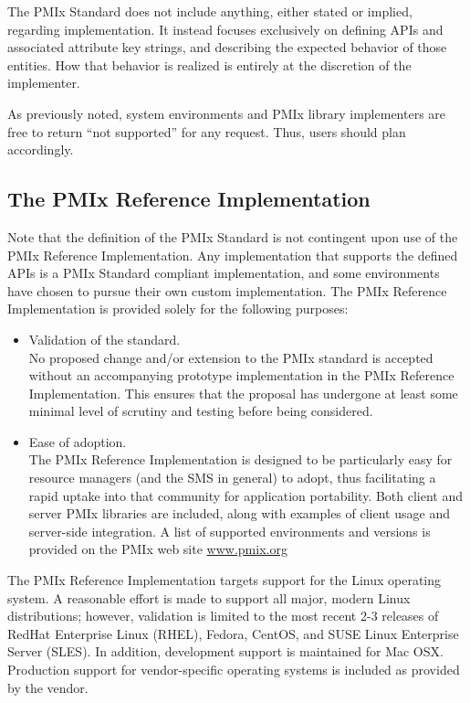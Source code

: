 The \ac{PMIx} Standard does not include anything, either stated or implied, regarding implementation.
It instead focuses exclusively on defining APIs and associated attribute key strings, and describing the expected behavior of those entities.
How that behavior is realized is entirely at the discretion of the implementer.

As previously noted, system environments and \ac{PMIx} library implementers are free to return ``not supported'' for any request. Thus, users should plan accordingly.

\subsection{The PMIx Reference Implementation}

Note that the definition of the \ac{PMIx} Standard is not contingent upon use of the \ac{PMIx} Reference Implementation.
Any implementation that supports the defined APIs is a \ac{PMIx} Standard compliant implementation, and some environments have chosen to pursue their own custom implementation.
The \ac{PMIx} Reference Implementation is provided solely for the following purposes:
\begin{itemize}
\item Validation of the standard.\\
No proposed change and/or extension to the \ac{PMIx} standard is accepted without an accompanying prototype implementation in the \ac{PMIx} Reference Implementation.
This ensures that the proposal has undergone at least some minimal level of scrutiny and testing before being considered.
\item Ease of adoption.\\
The \ac{PMIx} Reference Implementation is designed to be particularly easy for resource managers (and the \ac{SMS} in general) to adopt, thus facilitating a rapid uptake into that community for application portability.
Both client and server \ac{PMIx} libraries are included, along with examples of client usage and server-side integration.
A list of supported environments and versions is provided on the \ac{PMIx} web site \url{www.pmix.org}
\end{itemize}

The \ac{PMIx} Reference Implementation targets support for the Linux operating system.
A reasonable effort is made to support all major, modern Linux distributions; however, validation is limited to the most recent 2-3 releases of RedHat Enterprise Linux (RHEL), Fedora, CentOS, and SUSE Linux Enterprise Server (SLES).
In addition, development support is maintained for Mac OSX.
Production support for vendor-specific operating systems is included as provided by the vendor.

